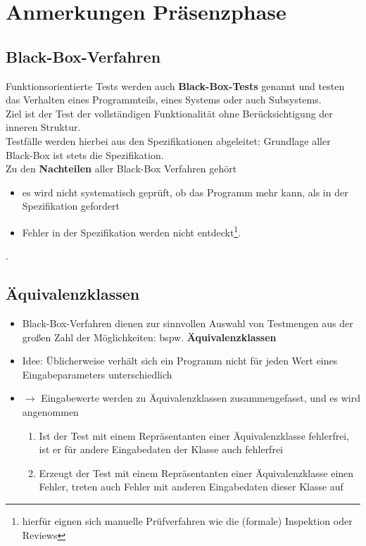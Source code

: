 \chapter{Anmerkungen Präsenzphase}

\section{Black-Box-Verfahren}

Funktionsorientierte Tests werden auch \textbf{Black-Box-Tests} genannt und testen das Verhalten eines Programmteils, eines Systems oder auch Subsystems.\\
Ziel ist der Test der vollständigen Funktionalität ohne Berücksichtigung der inneren Struktur.\\
Testfälle werden hierbei aus den Spezifikationen abgeleitet: Grundlage aller Black-Box ist stets die Spezifikation.\\

\noindent
Zu den \textbf{Nachteilen} aller Black-Box Verfahren gehört
\begin{itemize}
    \item es wird nicht systematisch geprüft, ob das Programm mehr kann, als in der Spezifikation gefordert
    \item Fehler in der Spezifikation werden nicht entdeckt\footnote{
    hierfür eignen sich manuelle Prüfverfahren wie die (formale) Inspektion oder Reviews
    }.
\end{itemize}.

\section{Äquivalenzklassen}

\begin{itemize}
    \item Black-Box-Verfahren dienen zur sinnvollen Auswahl von Testmengen aus der großen Zahl der Möglichkeiten: bspw. \textbf{Äquivalenzklassen}
    \item Idee: Üblicherweise verhält sich ein Programm nicht für jeden Wert eines Eingabeparameters unterschiedlich
    \item[] $\rightarrow$ Eingabewerte werden zu Äquivalenzklassen zusammengefasst, und es wird angenommen
    \begin{enumerate}
        \item Ist der Test mit einem Repräsentanten einer Äquivalenzklasse fehlerfrei, ist er für andere Eingabedaten der Klasse auch fehlerfrei
        \item Erzeugt der Test mit einem Repräsentanten einer Äquivalenzklasse einen Fehler, treten auch Fehler mit anderen Eingabedaten dieser Klasse auf
    \end{enumerate}
\end{itemize}

